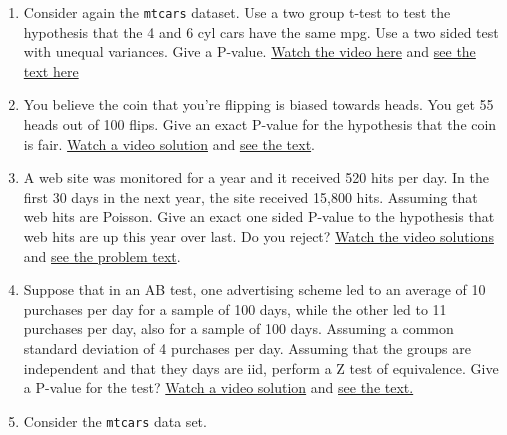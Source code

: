 \documentclass[]{article}
\begin{document}
\begin{enumerate}
\def\labelenumi{\arabic{enumi}.}
\setcounter{enumi}{3}
\itemsep1pt\parskip0pt
\item
  Consider again the \texttt{mtcars} dataset. Use a two group t-test to
  test the hypothesis that the 4 and 6 cyl cars have the same mpg. Use a
  two sided test with unequal variances. Give a P-value.
  \href{https://www.youtube.com/watch?v=Zo5TirzS9rU\&list=PLpl-gQkQivXhHOcVeU3bSJg78zaDYbP9L\&index=28}{Watch
  the video here} and
  \href{http://bcaffo.github.io/courses/06_StatisticalInference/homework/hw4.html\#4}{see
  the text here}
\item
  You believe the coin that you're flipping is biased towards heads. You
  get 55 heads out of 100 flips. Give an exact P-value for the
  hypothesis that the coin is fair.
  \href{https://www.youtube.com/watch?v=0sqOErsfhqo\&list=PLpl-gQkQivXhHOcVeU3bSJg78zaDYbP9L\&index=30}{Watch
  a video solution} and
  \href{http://bcaffo.github.io/courses/06_StatisticalInference/homework/hw4.html\#6}{see
  the text}.
\item
  A web site was monitored for a year and it received 520 hits per day.
  In the first 30 days in the next year, the site received 15,800 hits.
  Assuming that web hits are Poisson. Give an exact one sided P-value to
  the hypothesis that web hits are up this year over last. Do you
  reject?
  \href{https://www.youtube.com/watch?v=cE_88-Q7TX0\&index=31\&list=PLpl-gQkQivXhHOcVeU3bSJg78zaDYbP9L}{Watch
  the video solutions} and
  \href{http://bcaffo.github.io/courses/06_StatisticalInference/homework/hw4.html\#7}{see
  the problem text}.
\item
  Suppose that in an AB test, one advertising scheme led to an average
  of 10 purchases per day for a sample of 100 days, while the other led
  to 11 purchases per day, also for a sample of 100 days. Assuming a
  common standard deviation of 4 purchases per day. Assuming that the
  groups are independent and that they days are iid, perform a Z test of
  equivalence. Give a P-value for the test?
  \href{https://www.youtube.com/watch?v=Or4ly4rOiaA\&index=32\&list=PLpl-gQkQivXhHOcVeU3bSJg78zaDYbP9L}{Watch
  a video solution} and
  \href{http://bcaffo.github.io/courses/06_StatisticalInference/homework/hw4.html\#8}{see
  the text.}
\item
  Consider the \texttt{mtcars} data set.
\end{enumerate}
\end{document}
